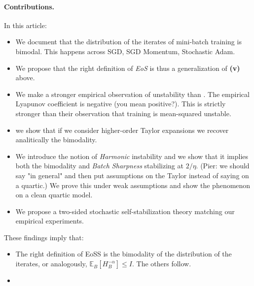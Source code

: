 \documentclass{article} %
\theoremstyle{plain}
\theoremstyle{definition}
\newcommand{\E}{\mathbb{E}}
\begin{document}
\paragraph{Contributions.} In this article:
\begin{itemize}[]
    \item We document that the distribution of the iterates of mini-batch training is bimodal. This happens across SGD, SGD Momentum, Stochastic Adam.
    \item We propose that the right definition of \textit{EoS} is thus a generalization of \textbf{(v)} above.
    \item We make a stronger empirical observation of unstability than \citep{andreyev}. The empirical Lyapunov coefficient is negative (you mean positive?). This is strictly stronger than their observation that training is mean-squared unstable.
    \item we show that if we consider higher-order Taylor expansions we recover analitically the bimodality.
    \item We introduce the notion of \textit{Harmonic} instability and we show that it implies both the bimodality and \textit{Batch Sharpness} stabilizing at $2/\eta$. (Pier: we should say "in general" and then put assumptions on the Taylor instead of saying on a quartic.) We prove this under weak assumptions and show the phenomenon on a clean quartic model.
    \item We propose a two-sided stochastic self-stabilization theory matching our empirical experiments.
\end{itemize}
These findings imply that:
\begin{itemize}[]
    \item The right definition of EoSS is the bimodality of the distribution of the iterates, or analogously, $\E_B [ H_B^{-\alpha} ] \leq I$. The others follow.
    \item 
\end{itemize}
\end{document}
